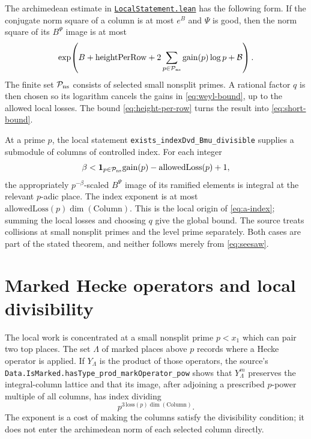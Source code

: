 \documentclass[11pt,oneside,openany]{amsbook}
\theoremstyle{remark}
\numberwithin{equation}{section}
\newcommand{\ghroot}{https://github.com/lsernau/grh-lean/blob/}
\newcommand{\ghrev}{72fead102f663d5c7a407964a13dc0cf9d977207}
\newcommand{\leanfile}[2]{%
  \href{\ghroot\ghrev/grh-compact/src/#1}{\nolinkurl{#2}}}
\begin{document}
The archimedean estimate
 in
\leanfile{New/Columns/LocalStatement.lean}{LocalStatement.lean}
has the following form. If the conjugate norm square of a
column is at most $e^B$ and $\Psi$ is good, then the norm
square of its $B^\Psi$ image is at most
\begin{equation}
\label{eq:weyl-bound}
\exp\!\left(B+\mathrm{heightPerRow}
  +2\sum_{p\in\mathcal P_{\rm ns}}
       \mathrm{gain}(p)\log p+\mathcal B\right).
\end{equation}
The finite set $\mathcal P_{\rm ns}$ consists of selected
small nonsplit primes. A rational factor $q$ is then chosen
so its logarithm cancels the gains in \eqref{eq:weyl-bound},
up to the allowed local losses. The bound
\eqref{eq:height-per-row} turns the result into
\eqref{eq:short-bound}.

At a prime $p$, the local statement
\texttt{exists\_indexDvd\_Bmu\_divisible} supplies a
submodule of columns of controlled index. For each integer
\[
\beta<\mathbf1_{p\in\mathcal P_{\rm ns}}
       \mathrm{gain}(p)-\mathrm{allowedLoss}(p)+1,
\]
the appropriately $p^{-\beta}$-scaled $B^\Psi$ image of
its ramified elements is integral at the relevant $p$-adic
place. The index exponent is at most
$\mathrm{allowedLoss}(p)\dim(\mathrm{Column})$.
This is the local origin of \eqref{eq:a-index}; summing
the local losses and choosing $q$ give the global bound.
The source treats collisions at small nonsplit primes and
the level prime separately. Both cases are part of the
stated theorem, and neither follows merely from
\eqref{eq:seesaw}.

\section{Marked Hecke operators and local divisibility}
\label{sec:marked-hecke}
The local work is concentrated at a small nonsplit prime
$p<x_1$ which can pair two top places. The set $\Lambda$
of marked places above $p$ records where a Hecke operator
is applied. If $Y_\Lambda$ is the product of those
operators, the source's
\texttt{Data.IsMarked.hasType\_prod\_markOperator\_pow}
shows that $Y_\Lambda^m$ preserves the integral-column
lattice and that its image, after adjoining a prescribed
$p$-power multiple of all columns, has index dividing
\begin{equation}
\label{eq:marked-index}
p^{3\,\mathrm{loss}(p)\dim(\mathrm{Column})}.
\end{equation}
The exponent is a cost of making the columns satisfy the
divisibility condition; it does not enter the archimedean
norm of each selected column directly.
\end{document}
